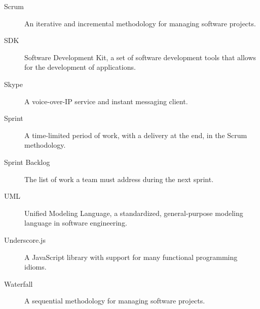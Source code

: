 \begin{description}
   \item[Scrum] An iterative and incremental methodology for managing software projects.
   \item[SDK] Software Development Kit, a set of software development tools that allows for the development of applications.
   \item[Skype] A voice-over-IP service and instant messaging client.
   \item[Sprint] A time-limited period of work, with a delivery at the end, in the Scrum methodology.
   \item[Sprint Backlog] The list of work a team must address during the next sprint.
   \item[UML] Unified Modeling Language, a standardized, general-purpose modeling language in software engineering.
   \item[Underscore.js] A JavaScript library with support for many functional programming idioms.
   \item[Waterfall] A sequential methodology for managing software projects.
\end{description}
